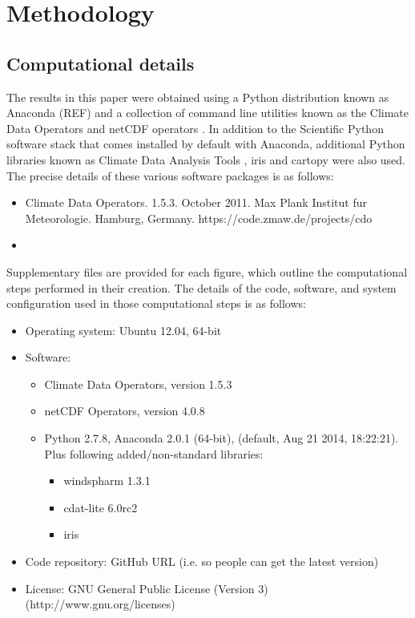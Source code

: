 \section{Methodology}\label{s:methodology}

\subsection{Computational details}\label{s:computational_details}

The results in this paper were obtained using a Python distribution known as Anaconda (REF) and a collection of command line utilities known as the Climate Data Operators \citep[CDO;][]{Schulzweida2014} and netCDF operators \citep[NCO;][]{Zender2014}. In addition to the Scientific Python \citep[SciPy;][]{SciPy} software stack that comes installed by default with Anaconda, additional Python libraries known as Climate Data Analysis Tools \citep[CDAT;][]{Doutriaux2009}, iris \citep{Iris} and cartopy \citep{Cartopy} were also used. The precise details of these various software packages is as follows:
\begin{itemize}
\item Climate Data Operators. 1.5.3. October 2011. Max Plank Institut fur Meteorologie. Hamburg, Germany. https://code.zmaw.de/projects/cdo
\item 
\end{itemize}


Supplementary files are provided for each figure, which outline the computational steps performed in their creation. The details of the code, software, and system configuration used in those computational steps is as follows:   
\begin{itemize}
\item Operating system: Ubuntu 12.04, 64-bit %
\item Software: 
\begin{itemize}
\item Climate Data Operators, version 1.5.3 \citep{Schulzweida2014} %
\item netCDF Operators, version 4.0.8 \citep{Zender2014} %
\item Python 2.7.8, Anaconda 2.0.1 (64-bit), (default, Aug 21 2014, 18:22:21). Plus following added/non-standard libraries:  %
\begin{itemize}
\item windspharm 1.3.1 %
\item cdat-lite 6.0rc2 %
\item iris \citep{Iris}
\end{itemize}
\end{itemize}
\item Code repository: GitHub URL (i.e. so people can get the latest version)
\item License: GNU General Public License (Version 3) (http://www.gnu.org/licenses) %
\end{itemize}



